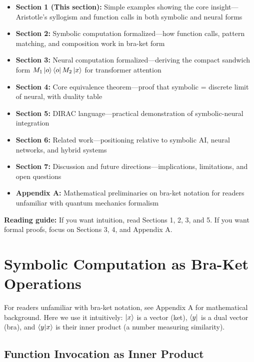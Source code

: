 \documentclass[11pt,a4paper]{article}
\theoremstyle{definition}
\begin{document}
\begin{itemize}
\item \textbf{Section 1 (This section):} Simple examples showing the core insight---Aristotle's syllogism and function calls in both symbolic and neural forms

\item \textbf{Section 2:} Symbolic computation formalized---how function calls, pattern matching, and composition work in bra-ket form

\item \textbf{Section 3:} Neural computation formalized---deriving the compact sandwich form $M_1 \ket{o}\bra{o} M_2 \ket{x}$ for transformer attention

\item \textbf{Section 4:} Core equivalence theorem---proof that symbolic = discrete limit of neural, with duality table

\item \textbf{Section 5:} DIRAC language---practical demonstration of symbolic-neural integration

\item \textbf{Section 6:} Related work---positioning relative to symbolic AI, neural networks, and hybrid systems

\item \textbf{Section 7:} Discussion and future directions---implications, limitations, and open questions

\item \textbf{Appendix A:} Mathematical preliminaries on bra-ket notation for readers unfamiliar with quantum mechanics formalism
\end{itemize}

\textbf{Reading guide:} If you want intuition, read Sections 1, 2, 3, and 5. If you want formal proofs, focus on Sections 3, 4, and Appendix A.

\section{Symbolic Computation as Bra-Ket Operations}

For readers unfamiliar with bra-ket notation, see Appendix A for mathematical background. Here we use it intuitively: $\ket{x}$ is a vector (ket), $\bra{y}$ is a dual vector (bra), and $\braket{y|x}$ is their inner product (a number measuring similarity).

\subsection{Function Invocation as Inner Product}
\end{document}
